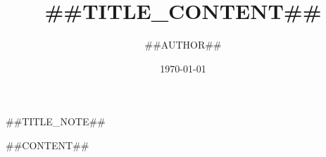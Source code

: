 \documentclass[10pt,landscape,twocolumn]{ctexart} %
\title{\Large\bfseries{##TITLE_CONTENT##}}			%
\author{##AUTHOR##}			%
\date{\today}
\begin{document}
	\onecolumn			%
	\maketitle			%
	\begin{center}
		##TITLE_NOTE##	%
	\end{center}

	\newpage
	\twocolumn			%
	\tableofcontents	%

	\newpage
	##CONTENT##			%
\end{document}
